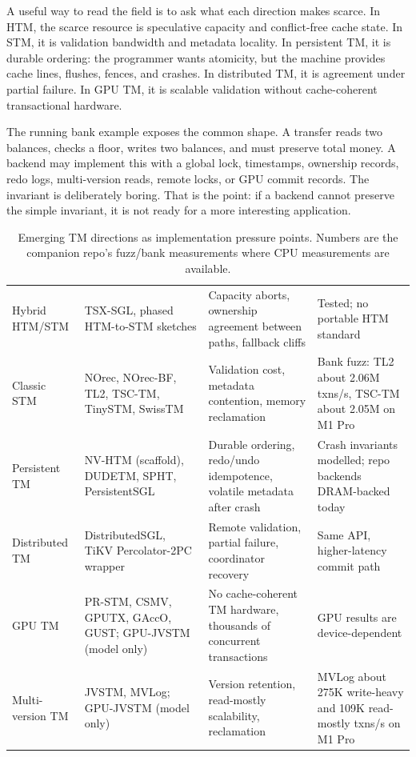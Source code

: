 A useful way to read the field is to ask what each direction makes scarce. In HTM, the scarce resource is speculative capacity and conflict-free cache state. In STM, it is validation bandwidth and metadata locality. In persistent TM, it is durable ordering: the programmer wants atomicity, but the machine provides cache lines, flushes, fences, and crashes. In distributed TM, it is agreement under partial failure. In GPU TM, it is scalable validation without cache-coherent transactional hardware.

The running bank example exposes the common shape. A transfer reads two balances, checks a floor, writes two balances, and must preserve total money. A backend may implement this with a global lock, timestamps, ownership records, redo logs, multi-version reads, remote locks, or GPU commit records. The invariant is deliberately boring. That is the point: if a backend cannot preserve the simple invariant, it is not ready for a more interesting application.

\begin{table}[htbp]
\centering
\begin{tabular}{M{0.18\textwidth}M{0.25\textwidth}M{0.30\textwidth}M{0.14\textwidth}}
\hline
{} &  &  &  \\
\hline
Hybrid HTM/STM & TSX-SGL, phased HTM-to-STM sketches & Capacity aborts, ownership agreement between paths, fallback cliffs & Tested; no portable HTM standard \\
Classic STM & NOrec, NOrec-BF, TL2, TSC-TM, TinySTM, SwissTM & Validation cost, metadata contention, memory reclamation & Bank fuzz: TL2 about 2.06M txns/s, TSC-TM about 2.05M on M1 Pro \\
Persistent TM & NV-HTM (scaffold), DUDETM, SPHT, PersistentSGL & Durable ordering, redo/undo idempotence, volatile metadata after crash & Crash invariants modelled; repo backends DRAM-backed today \\
Distributed TM & DistributedSGL, TiKV Percolator-2PC wrapper & Remote validation, partial failure, coordinator recovery & Same API, higher-latency commit path \\
GPU TM & PR-STM, CSMV, GPUTX, GAccO, GUST; GPU-JVSTM (model only) & No cache-coherent TM hardware, thousands of concurrent transactions & GPU results are device-dependent \\
Multi-version TM & JVSTM, MVLog; GPU-JVSTM (model only) & Version retention, read-mostly scalability, reclamation & MVLog about 275K write-heavy and 109K read-mostly txns/s on M1 Pro \\
\hline
\end{tabular}
\caption{Emerging TM directions as implementation pressure points. Numbers are the companion repo's fuzz/bank measurements where CPU measurements are available.}
\label{tab:emerging-directions}
\end{table}

